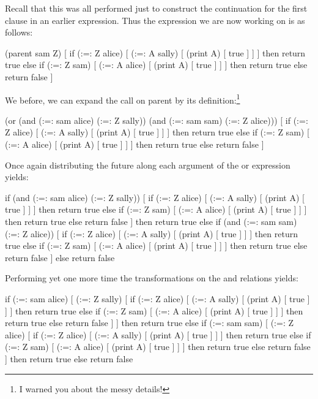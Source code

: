 Recall that this was all performed just to construct the continuation 
for the first clause in an earlier expression.
Thus the expression we are now working on is as follows:

\begin{cprog}
(parent sam Z) [
	if (:=: Z alice) [ (:=: A sally) [ (print A) [ true ] ] ]
	then return true
	else if (:=: Z sam) [ (:=: A alice) [ (print A) [ true ] ] ]
	then return true
	else return false ]
\end{cprog}

We before, we can expand the call on {\sf parent} by its
definition:\footnote{I warned you about the messy details!}

\begin{cprog}
(or
	(and (:=: sam alice) (:=: Z sally))
	(and (:=: sam sam) (:=: Z alice)))
[ if (:=: Z alice) [ (:=: A sally) [ (print A) [ true ] ] ]
	then return true
	else if (:=: Z sam) [ (:=: A alice) [ (print A) [ true ] ] ]
	then return true
	else return false ]
\end{cprog}

Once again distributing the future along each argument of the or expression
yields:

\begin{cprog}
if (and (:=: sam alice) (:=: Z sally))
	[ if (:=: Z alice) [ (:=: A sally) [ (print A) [ true ] ] ]
	then return true
	else if (:=: Z sam) [ (:=: A alice) [ (print A) [ true ] ] ]
	then return true
	else return false ]
then return true
else if (and (:=: sam sam) (:=: Z alice))
	[ if (:=: Z alice) [ (:=: A sally) [ (print A) [ true ] ] ]
	then return true
	else if (:=: Z sam) [ (:=: A alice) [ (print A) [ true ] ] ]
	then return true
	else return false ]
else return false
\end{cprog}

Performing yet one more time the transformations on the {\sf and} relations
yields:

\begin{cprog}
if (:=: sam alice) [ (:=: Z sally) 
	[ if (:=: Z alice) [ (:=: A sally) [ (print A) [ true ] ] ]
	then return true
	else if (:=: Z sam) [ (:=: A alice) [ (print A) [ true ] ] ]
	then return true
	else return false ] ]
then return true 
else if (:=: sam sam) [ (:=: Z alice)
	[ if (:=: Z alice) [ (:=: A sally) [ (print A) [ true ] ] ]
	then return true
	else if (:=: Z sam) [ (:=: A alice) [ (print A) [ true ] ] ]
	then return true
	else return false ]
then return true
else return false
\end{cprog}

